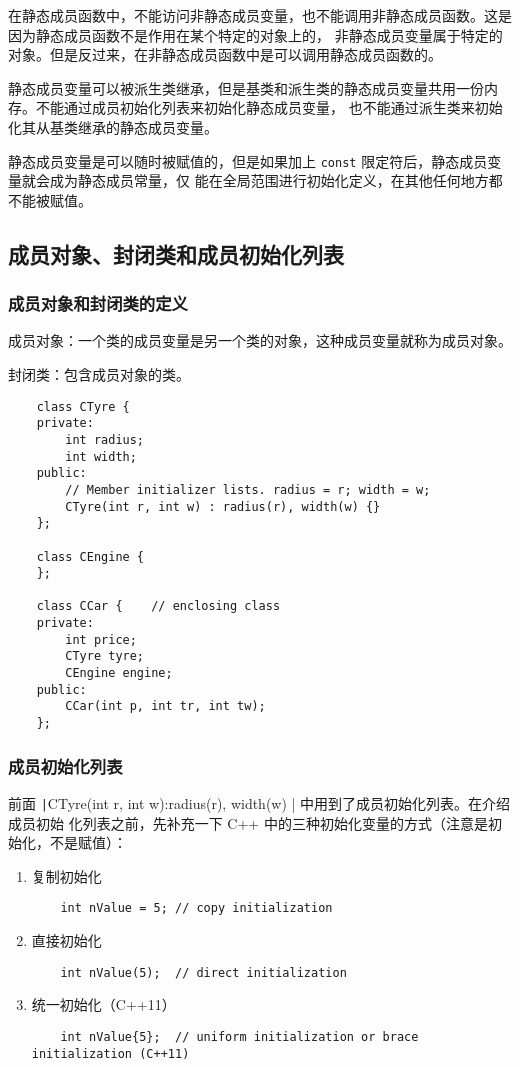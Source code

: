 \documentclass[UTF8]{ctexart}
\begin{document}
在静态成员函数中，不能访问非静态成员变量，也不能调用非静态成员函数。这是因为静态成员函数不是作用在某个特定的对象上的，
非静态成员变量属于特定的对象。但是反过来，在非静态成员函数中是可以调用静态成员函数的。

静态成员变量可以被派生类继承，但是基类和派生类的静态成员变量共用一份内存。不能通过成员初始化列表来初始化静态成员变量，
也不能通过派生类来初始化其从基类继承的静态成员变量。

静态成员变量是可以随时被赋值的，但是如果加上 \texttt{const} 限定符后，静态成员变量就会成为静态成员常量，仅
能在全局范围进行初始化定义，在其他任何地方都不能被赋值。

\subsection{成员对象、封闭类和成员初始化列表}
\subsubsection{成员对象和封闭类的定义}
成员对象：一个类的成员变量是另一个类的对象，这种成员变量就称为成员对象。

封闭类：包含成员对象的类。
\begin{verbatim}
    class CTyre {
    private:
        int radius;
        int width;
    public:
        // Member initializer lists. radius = r; width = w;
        CTyre(int r, int w) : radius(r), width(w) {}
    };

    class CEngine {
    };

    class CCar {    // enclosing class
    private:
        int price;
        CTyre tyre;
        CEngine engine;
    public:
        CCar(int p, int tr, int tw);
    };
\end{verbatim}

\subsubsection{成员初始化列表}
前面 \texttt|CTyre(int r, int w):radius(r), width(w) {}| 中用到了成员初始化列表。在介绍成员初始
化列表之前，先补充一下 C++ 中的三种初始化变量的方式（注意是初始化，不是赋值）：
\begin{enumerate}
    \item 复制初始化
    \begin{verbatim}
    int nValue = 5; // copy initialization
    \end{verbatim}
    \item 直接初始化
    \begin{verbatim}
    int nValue(5);  // direct initialization
    \end{verbatim}
    \item 统一初始化（C++11）
    \begin{verbatim}
    int nValue{5};  // uniform initialization or brace initialization (C++11)
    \end{verbatim}
\end{enumerate}
\end{document}
